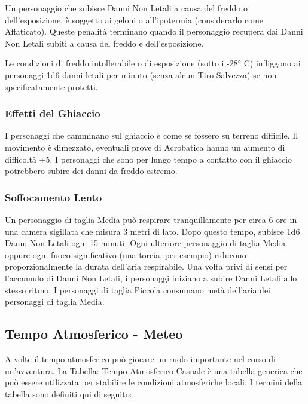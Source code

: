 \documentclass[a4paper,11pt,twoside,openany]{book}
\begin{document}
{Un personaggio che subisce Danni Non Letali a causa del freddo o dell'esposizione, è soggetto ai geloni o all'ipotermia (considerarlo come Affaticato). Queste penalità terminano quando il personaggio recupera dai Danni Non Letali subiti a causa del freddo e dell'esposizione. 

Le condizioni di freddo intollerabile o di esposizione (sotto i -28° C) infliggono ai personaggi 1d6 danni letali per minuto (senza alcun Tiro Salvezza) se non specificatamente protetti.

\subsubsection{Effetti del Ghiaccio}

I personaggi che camminano sul ghiaccio è come se fossero su terreno difficile. Il movimento è dimezzato, eventuali prove di Acrobatica hanno un aumento di difficoltà +5. I personaggi che sono per lungo tempo a contatto con il ghiaccio potrebbero subire dei danni da freddo estremo.

\subsubsection{Soffocamento Lento}

Un personaggio di taglia Media può respirare tranquillamente per circa 6 ore in una camera sigillata che misura 3 metri di lato. Dopo questo tempo, subisce 1d6 Danni Non Letali ogni 15 minuti. Ogni ulteriore personaggio di taglia Media oppure ogni fuoco significativo (una torcia, per esempio) riducono proporzionalmente la durata dell'aria respirabile. Una volta privi di sensi per l'accumulo di Danni Non Letali, i personaggi iniziano a subire Danni Letali allo stesso ritmo. I personaggi di taglia Piccola consumano metà dell'aria dei personaggi di taglia Media.

\pagebreak

\subsection{Tempo Atmosferico - Meteo}

\label{tempo-atmosferico---meteo}

A volte il tempo atmosferico può giocare un ruolo importante nel corso di un'avventura. La Tabella: Tempo Atmosferico Casuale è una tabella generica che può essere utilizzata per stabilire le condizioni atmosferiche locali. I termini della tabella sono definiti qui di seguito:

}
\end{document}
